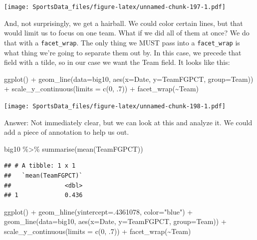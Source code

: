 \documentclass[
]{book}
\newenvironment{Shaded}{\begin{snugshade}}{\end{snugshade}}
\newcommand{\AttributeTok}[1]{\textcolor[rgb]{0.77,0.63,0.00}{#1}}
\newcommand{\DecValTok}[1]{\textcolor[rgb]{0.00,0.00,0.81}{#1}}
\newcommand{\FunctionTok}[1]{\textcolor[rgb]{0.00,0.00,0.00}{#1}}
\newcommand{\NormalTok}[1]{#1}
\newcommand{\SpecialCharTok}[1]{\textcolor[rgb]{0.00,0.00,0.00}{#1}}
\newcommand{\StringTok}[1]{\textcolor[rgb]{0.31,0.60,0.02}{#1}}
\begin{document}
\texttt{[image: SportsData\_files/figure-latex/unnamed-chunk-197-1.pdf]}

And, not surprisingly, we get a hairball. We could color certain lines, but that would limit us to focus on one team. What if we did all of them at once? We do that with a \texttt{facet\_wrap}. The only thing we MUST pass into a \texttt{facet\_wrap} is what thing we're going to separate them out by. In this case, we precede that field with a tilde, so in our case we want the Team field. It looks like this:

\begin{Shaded}
\begin{Highlighting}[]
\FunctionTok{ggplot}\NormalTok{() }\SpecialCharTok{+} 
  \FunctionTok{geom\_line}\NormalTok{(}\AttributeTok{data=}\NormalTok{big10, }\FunctionTok{aes}\NormalTok{(}\AttributeTok{x=}\NormalTok{Date, }\AttributeTok{y=}\NormalTok{TeamFGPCT, }\AttributeTok{group=}\NormalTok{Team)) }\SpecialCharTok{+} 
  \FunctionTok{scale\_y\_continuous}\NormalTok{(}\AttributeTok{limits =} \FunctionTok{c}\NormalTok{(}\DecValTok{0}\NormalTok{, .}\DecValTok{7}\NormalTok{)) }\SpecialCharTok{+} 
  \FunctionTok{facet\_wrap}\NormalTok{(}\SpecialCharTok{\textasciitilde{}}\NormalTok{Team)}
\end{Highlighting}
\end{Shaded}

\texttt{[image: SportsData\_files/figure-latex/unnamed-chunk-198-1.pdf]}

Answer: Not immediately clear, but we can look at this and analyze it. We could add a piece of annotation to help us out.

\begin{Shaded}
\begin{Highlighting}[]
\NormalTok{big10 }\SpecialCharTok{\%\textgreater{}\%} \FunctionTok{summarise}\NormalTok{(}\FunctionTok{mean}\NormalTok{(TeamFGPCT))}
\end{Highlighting}
\end{Shaded}

\begin{verbatim}
## # A tibble: 1 x 1
##   `mean(TeamFGPCT)`
##               <dbl>
## 1             0.436
\end{verbatim}

\begin{Shaded}
\begin{Highlighting}[]
\FunctionTok{ggplot}\NormalTok{() }\SpecialCharTok{+} 
  \FunctionTok{geom\_hline}\NormalTok{(}\AttributeTok{yintercept=}\NormalTok{.}\DecValTok{4361078}\NormalTok{, }\AttributeTok{color=}\StringTok{"blue"}\NormalTok{) }\SpecialCharTok{+} 
  \FunctionTok{geom\_line}\NormalTok{(}\AttributeTok{data=}\NormalTok{big10, }\FunctionTok{aes}\NormalTok{(}\AttributeTok{x=}\NormalTok{Date, }\AttributeTok{y=}\NormalTok{TeamFGPCT, }\AttributeTok{group=}\NormalTok{Team)) }\SpecialCharTok{+} 
  \FunctionTok{scale\_y\_continuous}\NormalTok{(}\AttributeTok{limits =} \FunctionTok{c}\NormalTok{(}\DecValTok{0}\NormalTok{, .}\DecValTok{7}\NormalTok{)) }\SpecialCharTok{+} 
  \FunctionTok{facet\_wrap}\NormalTok{(}\SpecialCharTok{\textasciitilde{}}\NormalTok{Team)}
\end{Highlighting}
\end{Shaded}
\end{document}
